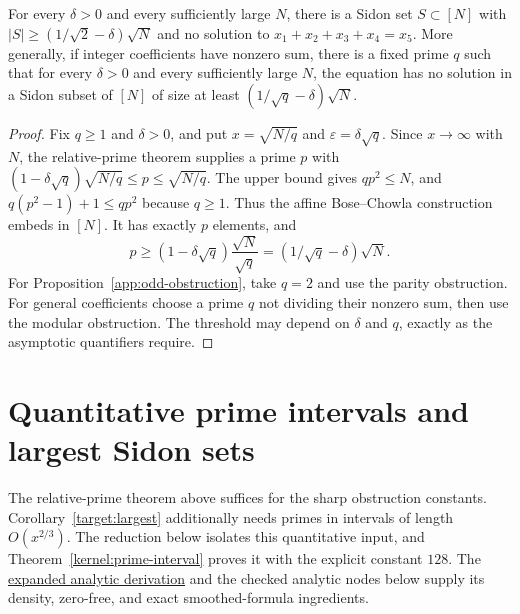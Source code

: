 \begin{theorem}
\label{construction:sharp-obstructions}
\leanok
For every $\delta>0$ and every sufficiently large $N$, there is a Sidon
set $S\subset[N]$ with
$|S|\ge(1/\sqrt2-\delta)\sqrt N$ and no solution to
$x_1+x_2+x_3+x_4=x_5$.
More generally, if integer coefficients have nonzero sum, there is a
fixed prime $q$ such that for every $\delta>0$ and every sufficiently
large $N$, the equation has no solution in a Sidon subset of $[N]$ of
size at least $(1/\sqrt q-\delta)\sqrt N$.
\end{theorem}
\begin{proof}
Fix $q\ge1$ and $\delta>0$, and put
$x=\sqrt{N/q}$ and $\varepsilon=\delta\sqrt q$.
Since $x\to\infty$ with $N$, the relative-prime theorem supplies a prime
$p$ with $(1-\delta\sqrt q)\sqrt{N/q}\le p\le\sqrt{N/q}$.
The upper bound gives $qp^2\le N$, and
$q(p^2-1)+1\le qp^2$ because $q\ge1$.
Thus the affine Bose--Chowla construction embeds in $[N]$.
It has exactly $p$ elements, and
\[
 p\ge(1-\delta\sqrt q)\frac{\sqrt N}{\sqrt q}
   =(1/\sqrt q-\delta)\sqrt N.
\]
For Proposition~\ref{app:odd-obstruction}, take $q=2$ and use the parity
obstruction.  For general coefficients choose a prime $q$ not dividing
their nonzero sum, then use the modular obstruction.
The threshold may depend on $\delta$ and $q$, exactly as the asymptotic
quantifiers require.
\end{proof}


\section{Quantitative prime intervals and largest Sidon sets}
\label{construction:prime-frontier}

The relative-prime theorem above suffices for the sharp obstruction
constants.  Corollary~\ref{target:largest} additionally needs primes in
intervals of length $O(x^{2/3})$.
The reduction below isolates this quantitative input, and
Theorem~\ref{kernel:prime-interval} proves it with the explicit constant
$128$.  The
\href{https://github.com/TomasOrtega/Sidon/blob/master/docs/ingham-prime-interval-proof.md}{expanded analytic derivation}
and the checked analytic nodes below supply its density, zero-free,
and exact smoothed-formula ingredients.


